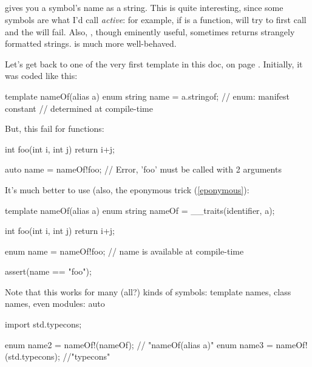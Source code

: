 \subsection{}

 gives you a symbol's name as a string. This is quite interesting, since some symbols are what I'd call \emph{active}: for example, if  is a function,  will try to first call  and the  will fail. Also, , though eminently useful, sometimes returns strangely formatted strings.  is much more well-behaved.

Let's get back to one of the very first template in this doc,  on page \pageref{templatedeclarationexamples}. Initially, it was coded like this:

\begin{dcode}
template nameOf(alias a)
{
    enum string name = a.stringof; // enum: manifest constant
                                   // determined at compile-time
}
\end{dcode}

But, this fail for functions:

\begin{dcode}
int foo(int i, int j) { return i+j;}

auto name = nameOf!foo; // Error, 'foo' must be called with 2 arguments
\end{dcode}

It's much better to use  (also, the eponymous trick (\ref{eponymous}):

\begin{dcode}
template nameOf(alias a)
{
    enum string nameOf = __traits(identifier, a);
}

int foo(int i, int j) { return i+j;}

enum name = nameOf!foo; // name is available at compile-time

assert(name == "foo");
\end{dcode}

Note that this works for many (all?) kinds of symbols: template names, class names, even modules:
auto
\begin{dcode}
import std.typecons;

enum name2 = nameOf!(nameOf); // "nameOf(alias a)"
enum name3 = nameOf!(std.typecons); //"typecons"
\end{dcode}

\subsection{}

